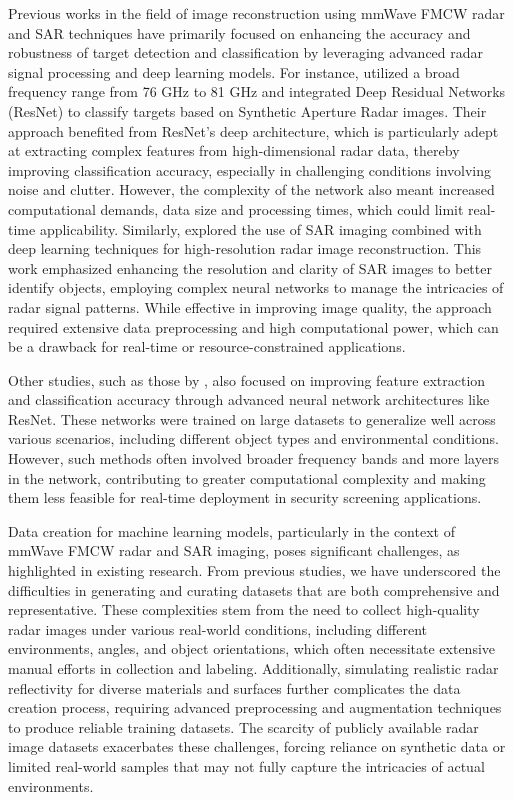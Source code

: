 \documentclass[journal,article,submit,pdftex,moreauthors]{Definitions/mdpi}
\begin{document}
Previous works in the field of image reconstruction using mmWave FMCW radar and SAR techniques have primarily focused on enhancing the accuracy and robustness of target detection and classification by leveraging advanced radar signal processing and deep learning models. For instance,\cite{liu2021deep, chen2021image} utilized a broad frequency range from 76 GHz to 81 GHz and integrated Deep Residual Networks (ResNet) to classify targets based on Synthetic Aperture Radar images. Their approach benefited from ResNet's deep architecture, which is particularly adept at extracting complex features from high-dimensional radar data, thereby improving classification accuracy, especially in challenging conditions involving noise and clutter. However, the complexity of the network also meant increased computational demands, data size and processing times, which could limit real-time applicability. Similarly, \cite{gao2020synthetic} explored the use of SAR imaging combined with deep learning techniques for high-resolution radar image reconstruction. This work emphasized enhancing the resolution and clarity of SAR images to better identify objects, employing complex neural networks to manage the intricacies of radar signal patterns. While effective in improving image quality, the approach required extensive data preprocessing and high computational power, which can be a drawback for real-time or resource-constrained applications.

Other studies, such as those by \cite{he2016deep, sun2019machine}, also focused on improving feature extraction and classification accuracy through advanced neural network architectures like ResNet. These networks were trained on large datasets to generalize well across various scenarios, including different object types and environmental conditions. However, such methods often involved broader frequency bands and more layers in the network, contributing to greater computational complexity and making them less feasible for real-time deployment in security screening applications.

Data creation for machine learning models, particularly in the context of mmWave FMCW radar and SAR imaging, poses significant challenges, as highlighted in existing research. From previous studies, we have underscored the difficulties in generating and curating datasets that are both comprehensive and representative. These complexities stem from the need to collect high-quality radar images under various real-world conditions, including different environments, angles, and object orientations, which often necessitate extensive manual efforts in collection and labeling. Additionally, simulating realistic radar reflectivity for diverse materials and surfaces further complicates the data creation process, requiring advanced preprocessing and augmentation techniques to produce reliable training datasets. The scarcity of publicly available radar image datasets exacerbates these challenges, forcing reliance on synthetic data or limited real-world samples that may not fully capture the intricacies of actual environments.
\end{document}
